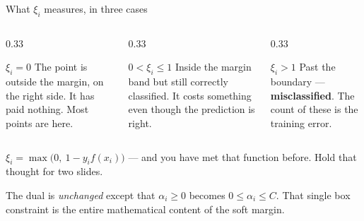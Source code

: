 \documentclass[aspectratio=169]{beamer}
\begin{document}
\begin{frame}[shrink=6]{What $\xi_i$ measures, in three cases}
  \begin{columns}[T]
    \begin{column}{0.33\textwidth}
      \begin{block}{$\xi_i = 0$}
        The point is outside the margin, on the right side. It has paid
        nothing. Most points are here.
      \end{block}
    \end{column}
    \begin{column}{0.33\textwidth}
      \begin{block}{$0 < \xi_i \le 1$}
        Inside the margin band but still correctly classified. It costs
        something even though the prediction is right.
      \end{block}
    \end{column}
    \begin{column}{0.33\textwidth}
      \begin{block}{$\xi_i > 1$}
        Past the boundary --- \textbf{misclassified}. The count of these is
        the training error.
      \end{block}
    \end{column}
  \end{columns}
  \vspace{0.3em}
  \begin{exampleblock}{}
    \centering
    $\xi_i = \max\bigl(0,\ 1 - y_i f(x_i)\bigr)$ --- and you have met that
    function before. Hold that thought for two slides.
  \end{exampleblock}
  \begin{center}\small
    The dual is \emph{unchanged} except that $\alpha_i \ge 0$ becomes
    $0 \le \alpha_i \le C$. That single box constraint is the entire
    mathematical content of the soft margin.
  \end{center}
\end{frame}
\end{document}
